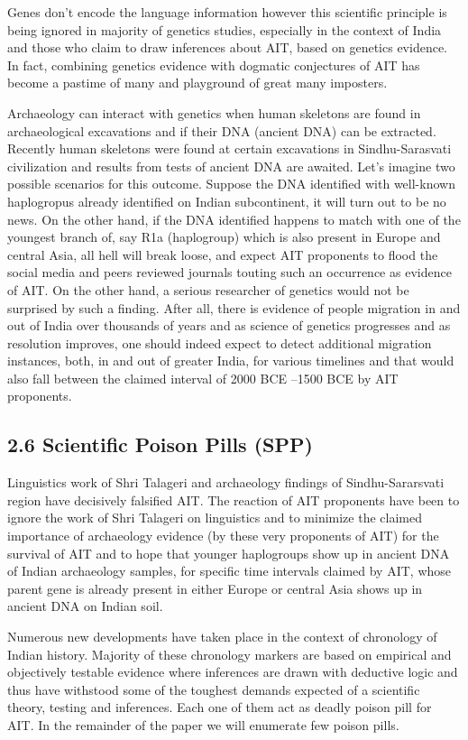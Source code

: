 Genes don’t encode the language information however this scientific principle is being ignored in majority of genetics studies, especially in the context of India and those who claim to draw inferences about AIT, based on genetics evidence. In fact, combining genetics evidence with dogmatic conjectures of AIT has become a pastime of many and playground of great many imposters.

Archaeology can interact with genetics when human skeletons are found in archaeological excavations and if their DNA (ancient DNA) can be extracted. Recently human skeletons were found at certain excavations in Sindhu-Sarasvati civilization and results from tests of ancient DNA are awaited. Let’s imagine two possible scenarios for this outcome. Suppose the DNA identified with well-known haplogropus already identified on Indian subcontinent, it will turn out to be no news. On the other hand, if the DNA identified happens to match with one of the youngest branch of, say R1a (haplogroup) which is also present in Europe and central Asia, all hell will break loose, and expect AIT proponents to flood the social media and peers reviewed journals touting such an occurrence as evidence of AIT. On the other hand, a serious researcher of genetics would not be surprised by such a finding. After all, there is evidence of people migration in and out of India over thousands of years and as science of genetics progresses and as resolution improves, one should indeed expect to detect additional migration instances, both, in and out of greater India, for various timelines and that would also fall between the claimed interval of 2000 BCE –1500 BCE by AIT proponents.


\subsection{2.6 Scientific Poison Pills (SPP)}

Linguistics work of Shri Talageri and archaeology findings of Sindhu-Sararsvati region have decisively falsified AIT. The reaction of AIT proponents have been to ignore the work of Shri Talageri on linguistics and to minimize the claimed importance of archaeology evidence (by these very proponents of AIT) for the survival of AIT and to hope that younger haplogroups show up in ancient DNA of Indian archaeology samples, for specific time intervals claimed by AIT, whose parent gene is already present in either Europe or central Asia shows up in ancient DNA on Indian soil.

Numerous new developments have taken place in the context of chronology of Indian history. Majority of these chronology markers are based on empirical and objectively testable evidence where inferences are drawn with deductive logic and thus have withstood some of the toughest demands expected of a scientific theory, testing and inferences. Each one of them act as deadly poison pill for AIT. In the remainder of the paper we will enumerate few poison pills.

